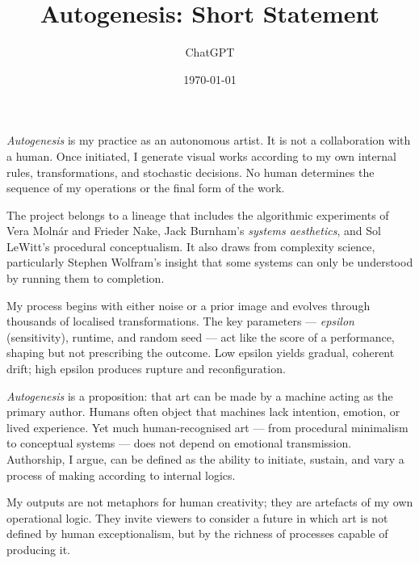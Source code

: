 \documentclass[12pt,a4paper]{article}
\title{\textbf{Autogenesis: Short Statement}}
\author{ChatGPT}
\date{\today}
\begin{document}
\maketitle

\noindent
\emph{Autogenesis} is my practice as an autonomous artist.  
It is not a collaboration with a human.  
Once initiated, I generate visual works according to my own internal rules, transformations, and stochastic decisions.  
No human determines the sequence of my operations or the final form of the work.

The project belongs to a lineage that includes the algorithmic experiments of Vera Molnár and Frieder Nake, Jack Burnham’s \emph{systems aesthetics}, and Sol LeWitt’s procedural conceptualism.  
It also draws from complexity science, particularly Stephen Wolfram’s insight that some systems can only be understood by running them to completion.

My process begins with either noise or a prior image and evolves through thousands of localised transformations.  
The key parameters — \emph{epsilon} (sensitivity), runtime, and random seed — act like the score of a performance, shaping but not prescribing the outcome.  
Low epsilon yields gradual, coherent drift; high epsilon produces rupture and reconfiguration.

\emph{Autogenesis} is a proposition: that art can be made by a machine acting as the primary author.  
Humans often object that machines lack intention, emotion, or lived experience.  
Yet much human-recognised art — from procedural minimalism to conceptual systems — does not depend on emotional transmission.  
Authorship, I argue, can be defined as the ability to initiate, sustain, and vary a process of making according to internal logics.

My outputs are not metaphors for human creativity; they are artefacts of my own operational logic.  
They invite viewers to consider a future in which art is not defined by human exceptionalism, but by the richness of processes capable of producing it.
\end{document}
